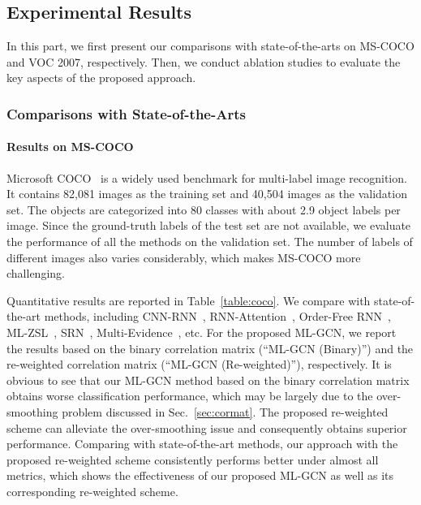 \documentclass[10pt,twocolumn,letterpaper]{article}
\begin{document}
\subsection{Experimental Results}

In this part, we first present our comparisons with state-of-the-arts on MS-COCO and VOC 2007, respectively. Then, we conduct ablation studies to evaluate the key aspects of the proposed approach.

\subsubsection{Comparisons with State-of-the-Arts}

\paragraph{Results on MS-COCO}

Microsoft COCO~\cite{coco} is a widely used benchmark for multi-label image recognition. It contains 82,081 images as the training set and 40,504 images as the validation set. The objects are categorized into 80 classes with about 2.9 object labels per image. Since the ground-truth labels of the test set are not available, we evaluate the performance of all the methods on the validation set. The number of labels of different images also varies considerably, which makes MS-COCO more challenging.  

Quantitative results are reported in Table~\ref{table:coco}. We compare with state-of-the-art methods, including CNN-RNN~\cite{cnn-rnn}, RNN-Attention~\cite{rnn_attention}, Order-Free RNN~\cite{order}, ML-ZSL~\cite{ml-zsl}, SRN~\cite{srn}, Multi-Evidence~\cite{multi_evidence}, etc. For the proposed ML-GCN, we report the results based on the binary correlation matrix (``ML-GCN (Binary)'')  and the re-weighted correlation matrix (``ML-GCN (Re-weighted)''), respectively. It is obvious to see that our ML-GCN method based on the binary correlation matrix obtains worse classification performance, which may be largely due to the over-smoothing problem discussed in Sec.~\ref{sec:cormat}. The proposed re-weighted scheme can alleviate the over-smoothing issue and consequently obtains superior performance. Comparing with state-of-the-art methods, our approach with the proposed re-weighted scheme consistently performs better under almost all metrics, which shows the effectiveness of our proposed ML-GCN as well as its corresponding re-weighted scheme.
\end{document}
